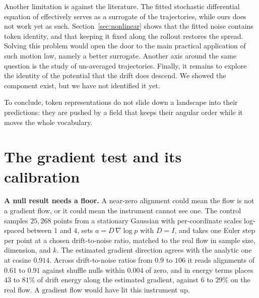 \documentclass[mlmain]{jmlr}
\begin{document}
Another limitation is against the literature. The fitted stochastic differential equation of
\citet{sarfati2024lines} effectively serves as a surrogate of the trajectories,
while ours does not work yet as such. Section~\ref{sec:nonlinear} shows that the fitted noise contains
token identity, and that keeping it fixed along the rollout restores the
spread. Solving this problem would open the door to the main practical
application of such motion law, namely a better surrogate. Another axis around the same question is the study of un-averaged trajectories.
Finally, it remains to explore the identity of the potential that the drift does descend.
We showed the component exist, but we have not identified it yet.

To conclude, token representations do not slide down a landscape into their predictions: they are pushed by a field that keeps their angular order while it moves the whole vocabulary.





\appendix
\section{The gradient test and its calibration}
\label{app:grad}

\textbf{A null result needs a floor.} A near-zero alignment could mean
the flow is not a gradient flow, or it could mean the instrument cannot
see one. The control samples $25{,}268$ points from a stationary
Gaussian with per-coordinate scales log-spaced between $1$ and $4$,
sets $a = D\,\nabla\log p$ with $D = I$, and takes one Euler step per
point at a chosen drift-to-noise ratio, matched to the real flow in
sample size, dimension, and $k$. The estimated gradient direction
agrees with the analytic one at cosine $0.914$. Across drift-to-noise
ratios from $0.9$ to $106$ it reads alignments of $0.61$ to $0.91$
against shuffle nulls within $0.004$ of zero, and in energy terms
places $43$ to $81\%$ of drift energy along the estimated gradient,
against $6$ to $29\%$ on the real flow. A gradient flow would have lit
this instrument up.
\end{document}

